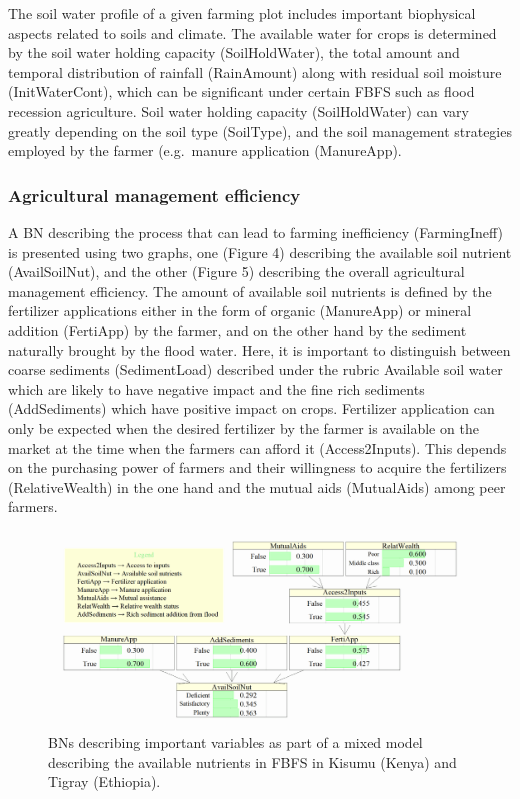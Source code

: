 \documentclass[12pt,oneside]{article}
\begin{document}
The soil water profile of a given farming plot includes important biophysical aspects related to soils and climate. The available water for crops is determined by the soil water holding capacity (SoilHoldWater), the total amount and temporal distribution of rainfall (RainAmount) along with residual soil moisture (InitWaterCont), which can be significant under certain FBFS such as flood recession agriculture. Soil water holding capacity (SoilHoldWater) can vary greatly depending on the soil type (SoilType), and the soil management strategies employed by the farmer (e.g.~manure application (ManureApp).

\hypertarget{I13}{%
\subsubsection{Agricultural management efficiency}\label{I13}}

A BN describing the process that can lead to farming inefficiency (FarmingIneff) is presented using two graphs, one (Figure 4) describing the available soil nutrient (AvailSoilNut), and the other (Figure 5) describing the overall agricultural management efficiency. The amount of available soil nutrients is defined by the fertilizer applications either in the form of organic (ManureApp) or mineral addition (FertiApp) by the farmer, and on the other hand by the sediment naturally brought by the flood water. Here, it is important to distinguish between coarse sediments (SedimentLoad) described under the rubric Available soil water which are likely to have negative impact and the fine rich sediments (AddSediments) which have positive impact on crops. Fertilizer application can only be expected when the desired fertilizer by the farmer is available on the market at the time when the farmers can afford it (Access2Inputs). This depends on the purchasing power of farmers and their willingness to acquire the fertilizers (RelativeWealth) in the one hand and the mutual aids (MutualAids) among peer farmers.

\begin{figure}[!htbp]

{\centering \includegraphics[width=1\linewidth,]{figures/Modelling_FBFS_Available_soil_Nutrients_BNs_plot} 

}

\caption{BNs describing important variables as part of a mixed model describing the available nutrients in FBFS in Kisumu (Kenya) and Tigray (Ethiopia).}\label{fig:fig4}
\end{figure}
\end{document}
